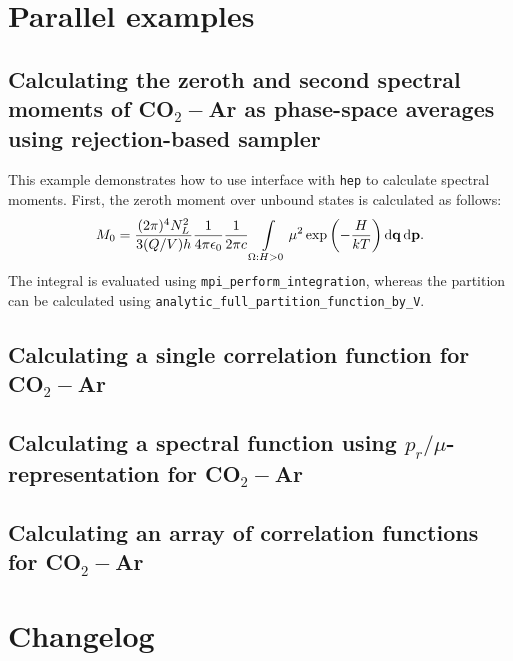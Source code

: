 \documentclass{article}
\newcommand{\lb}{\left(}
\newcommand{\rb}{\right)}
\newcommand{\mf}{\mathbf}
\newcommand*\diff{\mathop{}\!\mathrm{d}}
\begin{document}
\section{Parallel examples}
\label{sec:parallel-examples}

\subsection{Calculating the zeroth and second spectral moments of CO$_2-$Ar as phase-space averages using rejection-based sampler}
\label{subsec:example-spmoments-co2-ar}

This example demonstrates how to use interface with \texttt{hep} to calculate spectral moments. First, the zeroth moment over unbound states is calculated as follows:
\begin{gather}
    M_0 = \frac{(2 \pi)^4 N_L^2}{3 (Q/V) h} \frac{1}{4 \pi \epsilon_0} \frac{1}{2 \pi c} \int\limits_{\Omega: H > 0} \mu^2 \exp \lb -\frac{H}{kT} \rb \diff{\mf{q}} \diff{\mf{p}}. \notag
\end{gather}
%
The integral is evaluated using \texttt{mpi\_perform\_integration}, whereas the partition can be calculated using \texttt{analytic\_full\_partition\_function\_by\_V}.    


\subsection{Calculating a single correlation function for CO$_2-$Ar}
\label{subsec:example-correlation-co2-ar}

\subsection{Calculating a spectral function using $p_r/\mu$-representation for CO$_2-$Ar}
\label{subsec:example-prmu-co2-ar}

\subsection{Calculating an array of correlation functions for CO$_2-$Ar}
\label{subsec:example-correlation-array-co2-ar}


\section{Changelog}
\label{sec:changelog}
\end{document}
